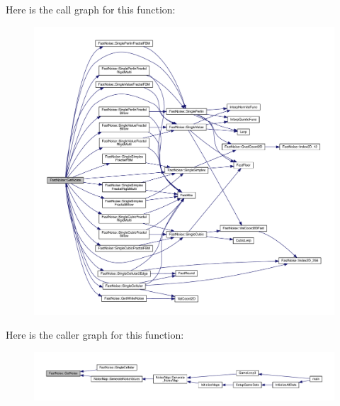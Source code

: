 Here is the call graph for this function\+:\nopagebreak
\begin{figure}[H]
\begin{center}
\leavevmode
\includegraphics[width=350pt]{d1/dd8/class_fast_noise_a61722acaa5692a40ee939d578b6a40d1_cgraph}
\end{center}
\end{figure}
Here is the caller graph for this function\+:
\nopagebreak
\begin{figure}[H]
\begin{center}
\leavevmode
\includegraphics[width=350pt]{d1/dd8/class_fast_noise_a61722acaa5692a40ee939d578b6a40d1_icgraph}
\end{center}
\end{figure}
\mbox{\label{class_fast_noise_a0d9b7a6858a599cde4dc5b8f74264ae0}} 
